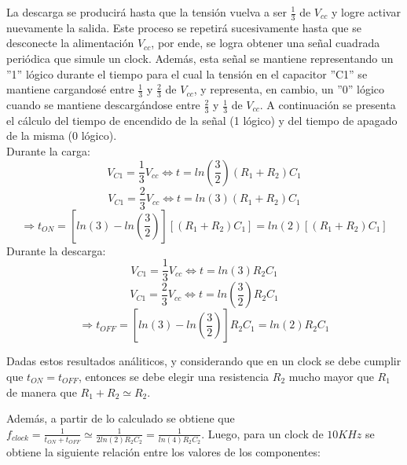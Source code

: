 La descarga se producirá hasta que la tensión vuelva a ser $\frac{1}{3}$
de $V_{cc}$ y logre activar nuevamente la salida. Este proceso se
repetirá sucesivamente hasta que se desconecte la alimentación $V_{cc}$,
por ende, se logra obtener una señal cuadrada periódica que simule
un clock. Además, esta señal se mantiene representando un ''1''
lógico durante el tiempo para el cual la tensión en el capacitor ''C1''
se mantiene cargandosé entre $\frac{1}{3}$ y $\frac{2}{3}$ de $V_{cc}$,
y representa, en cambio, un ''0'' lógico cuando se mantiene descargándose
entre $\frac{2}{3}$ y $\frac{1}{3}$ de $V_{cc}$. A continuación
se presenta el cálculo del tiempo de encendido de la señal (1
lógico) y del tiempo de apagado de la misma (0 lógico).\\
\vspace{5mm}
Durante la carga:
\begin{equation}
V_{C1}=\frac{1}{3}V_{cc}\Longleftrightarrow t=ln(\frac{3}{2})(R_{1}+R_{2})C_{1}    
\end{equation}
\begin{equation}
V_{C1}=\frac{2}{3}V_{cc}\Longleftrightarrow t=ln(3)(R_{1}+R_{2})C_{1}
\end{equation}
\begin{equation}
\Rightarrow t_{ON}=[ln(3)-ln(\frac{3}{2})][(R_{1}+R_{2})C_{1}]=ln(2)[(R_{1}+R_{2})C_{1}]
\end{equation}
\vspace{5mm}
Durante la descarga:
\begin{equation}
V_{C1}=\frac{1}{3}V_{cc}\Longleftrightarrow t=ln(3)R_{2}C_{1}
\end{equation}
\begin{equation}
V_{C1}=\frac{2}{3}V_{cc}\Longleftrightarrow t=ln(\frac{3}{2})R_{2}C_{1}
\end{equation}
\begin{equation}
\Rightarrow t_{OFF}=[ln(3)-ln(\frac{3}{2})]R_{2}C_{1}=ln(2)R_{2}C_{1}
\end{equation}

\vspace{5mm}
Dadas estos resultados análiticos, y considerando que en un clock
se debe cumplir que $t_{ON}=t_{OFF}$, entonces se debe elegir una
resistencia $R_{2}$ mucho mayor que $R_{1}$ de manera que
$R_{1}+R_{2}\simeq R_{2}$.

Además, a partir de lo calculado se obtiene que $f_{clock}=\frac{1}{t_{ON}+t_{OFF}}\simeq\frac{1}{2ln(2)R_{2}C_{2}}=\frac{1}{ln(4)R_{2}C_{2}}$.
Luego, para un clock de $10KHz$ se obtiene la siguiente relación
entre los valores de los componentes:

